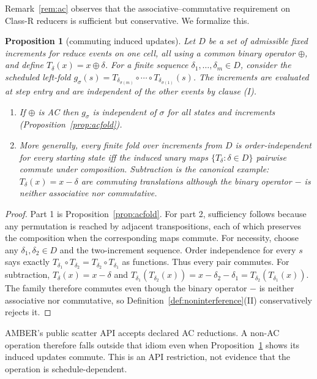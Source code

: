 \documentclass[sigconf,nonacm,review,natbib=true]{acmart}
\newtheorem{proposition}{Proposition}
\theoremstyle{definition}
\theoremstyle{plain}
\theoremstyle{remark}
\begin{document}
Remark~\ref{rem:ac} observes that the associative--commutative requirement on
Class-R reducers is sufficient but conservative. We formalize this.

\begin{proposition}[commuting induced updates]\label{prop:commuting}
Let $D$ be a set of admissible fixed increments for reduce events on one cell,
all using a common binary operator $\oplus$, and define
$T_\delta(x)=x\oplus\delta$. For a finite sequence
$\delta_1,\dots,\delta_m\in D$, consider the scheduled left-fold
$g_\sigma(s)=T_{\delta_{\sigma(m)}}\circ\cdots\circ
T_{\delta_{\sigma(1)}}(s)$. The increments are evaluated at step entry and are
independent of the other events by clause (I).

\begin{enumerate}
\item If $\oplus$ is AC then $g_\sigma$ is independent of $\sigma$ for all
states and increments (Proposition~\ref{prop:acfold}).
\item More generally, every finite fold over increments from $D$ is
order-independent for every starting state iff the induced unary maps
$\{T_\delta:\delta\in D\}$ pairwise commute under composition. Subtraction is
the canonical example:
$T_\delta(x)=x-\delta$ are commuting translations although the binary operator
$-$ is neither associative nor commutative.
\end{enumerate}
\end{proposition}

\begin{proof} Part 1 is Proposition~\ref{prop:acfold}. For part 2,
sufficiency follows because any permutation is reached by adjacent
transpositions, each of which preserves the composition when the corresponding
maps commute. For necessity, choose any $\delta_1,\delta_2\in D$ and the
two-increment sequence. Order independence for every $s$ says exactly
$T_{\delta_1}\circ T_{\delta_2}=T_{\delta_2}\circ T_{\delta_1}$ as functions.
Thus every pair commutes. For subtraction,
$T_\delta(x)=x-\delta$ and
$T_{\delta_1}(T_{\delta_2}(x))=x-\delta_2-\delta_1=
T_{\delta_2}(T_{\delta_1}(x))$. The family therefore commutes even though the
binary operator $-$ is neither associative nor commutative, so
Definition~\ref{def:noninterference}(II) conservatively rejects it. \end{proof}

AMBER's public scatter API accepts declared AC reductions. A non-AC operation
therefore falls outside that idiom even when Proposition~\ref{prop:commuting}
shows its induced updates commute. This is an API restriction, not evidence that
the operation is schedule-dependent.
\end{document}
